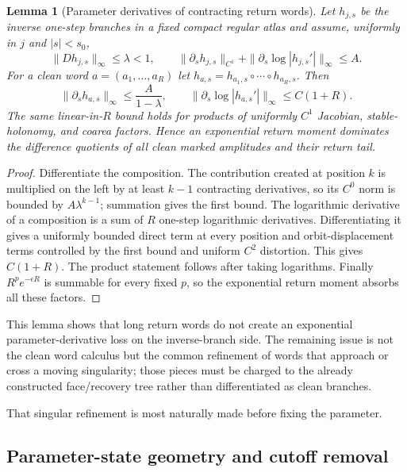 \documentclass[11pt]{article}
\newtheorem{lemma}[theorem]{Lemma}
\begin{document}
\begin{lemma}[Parameter derivatives of contracting return words]
\label{lem:parametric-inverse-word}
Let $h_{j,s}$ be the inverse one-step branches in a fixed compact regular
atlas and assume, uniformly in $j$ and $|s|<s_0$,
\[
 \|Dh_{j,s}\|_\infty\le\lambda<1,
 \qquad
 \|\partial_sh_{j,s}\|_{C^1}
 +\|\partial_s\log|h_{j,s}'|\|_\infty\le A.
\]
For a clean word $a=(a_1,\ldots,a_R)$ let
$h_{a,s}=h_{a_1,s}\circ\cdots\circ h_{a_R,s}$.  Then
\begin{equation}
\label{eq:parametric-word-bounds}
 \|\partial_s h_{a,s}\|_\infty\le \frac{A}{1-\lambda},
 \qquad
 \|\partial_s\log|h_{a,s}'|\|_\infty\le C(1+R).
\end{equation}
The same linear-in-$R$ bound holds for products of uniformly $C^1$
Jacobian, stable-holonomy, and coarea factors.  Hence an exponential return
moment dominates the difference quotients of all clean marked amplitudes and
their return tail.
\end{lemma}

\begin{proof}
Differentiate the composition.  The contribution created at position $k$ is
multiplied on the left by at least $k-1$ contracting derivatives, so its
$C^0$ norm is bounded by $A\lambda^{k-1}$; summation gives the first bound.
The logarithmic derivative of a composition is a sum of $R$ one-step
logarithmic derivatives.  Differentiating it gives a uniformly bounded direct
term at every position and orbit-displacement terms controlled by the first
bound and uniform $C^2$ distortion.  This gives $C(1+R)$.  The product
statement follows after taking logarithms.  Finally
$R^p e^{-\epsilon R}$ is summable for every fixed $p$, so the exponential
return moment absorbs all these factors.
\end{proof}

This lemma shows that long return words do not create an exponential
parameter-derivative loss on the inverse-branch side.  The remaining issue is
not the clean word calculus but the common refinement of words that approach
or cross a moving singularity; those pieces must be charged to the already
constructed face/recovery tree rather than differentiated as clean branches.

That singular refinement is most naturally made before fixing the parameter.

\subsection{Parameter-state geometry and cutoff removal}
\label{sec:parameter-state}
\end{document}
